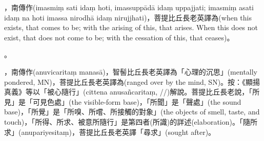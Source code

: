\startitemgroup[noteitems]
\item{}，南傳作(imasmiṃ sati idaṃ hoti, imassuppādā idaṃ uppajjati; imasmiṃ asati idaṃ na hoti imassa nirodhā idaṃ nirujjhati)，菩提比丘長老英譯為(when this exists, that comes to be; with the arising of this, that arises. When this does not exist, that does not come to be; with the cessation of this, that ceases)。
\stopitemgroup

\startitemgroup[noteitems]
\item{}。
\stopitemgroup

\startitemgroup[noteitems]
\item{}，南傳作(anuvicaritaṃ manasā)，智髻比丘長老英譯為「心理的沉思」(mentally pondered, MN)，菩提比丘長老英譯為(ranged over by the mind, SN)。按：《顯揚真義》等以「被心隨行」(cittena anusañcaritaṃ, //)解說。菩提比丘長老說，「所見」是「可見色處」(the visible-form base)，「所聞」是「聲處」(the sound base)，「所覺」是「所嗅、所嚐、所接觸的對象」(the objects of smell, taste, and touch)，「所得、所求、被意所隨行」是第四者(所識)的詳述(elaboration)。「隨所求」(anupariyesitaṃ)，菩提比丘長老英譯「尋求」(sought after)。
\stopitemgroup

